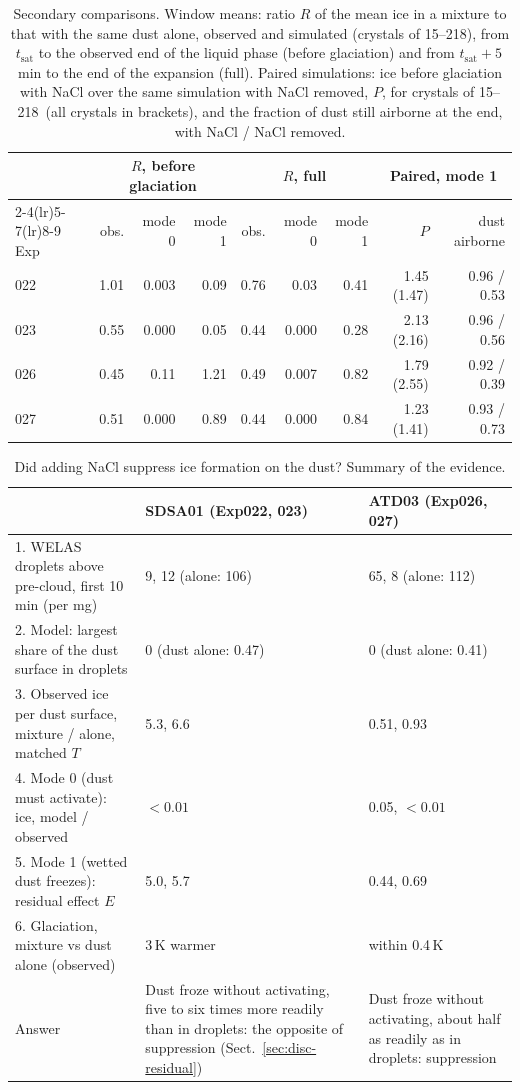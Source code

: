 \begin{table}[p]
\centering\footnotesize\setlength{\tabcolsep}{4pt}
\caption{Secondary comparisons. Window means: ratio $R$ of the mean ice in a mixture to that with the same dust alone, observed and simulated (crystals of 15--218\um), from $t_\mathrm{sat}$ to the observed end of the liquid phase (before glaciation) and from $t_\mathrm{sat}+5$\,min to the end of the expansion (full). Paired simulations: ice before glaciation with NaCl over the same simulation with NaCl removed, $P$, for crystals of 15--218\um\ (all crystals in brackets), and the fraction of dust still airborne at the end, with NaCl / NaCl removed.}
\label{tab:window}
\begin{tabular}{lrrrrrrrr}
\toprule
 & \multicolumn{3}{c}{$R$, before glaciation} & \multicolumn{3}{c}{$R$, full} & \multicolumn{2}{c}{Paired, mode 1} \\
\cmidrule(lr){2-4}\cmidrule(lr){5-7}\cmidrule(lr){8-9}
Exp & obs. & mode 0 & mode 1 & obs. & mode 0 & mode 1 & $P$ & dust airborne \\
\midrule
022 & 1.01 & 0.003 & 0.09 & 0.76 & 0.03 & 0.41 & 1.45 (1.47) & 0.96 / 0.53 \\
023 & 0.55 & 0.000 & 0.05 & 0.44 & 0.000 & 0.28 & 2.13 (2.16) & 0.96 / 0.56 \\
026 & 0.45 & 0.11 & 1.21 & 0.49 & 0.007 & 0.82 & 1.79 (2.55) & 0.92 / 0.39 \\
027 & 0.51 & 0.000 & 0.89 & 0.44 & 0.000 & 0.84 & 1.23 (1.41) & 0.93 / 0.73 \\
\bottomrule
\end{tabular}
\end{table}

\begin{table}[p]
\centering\footnotesize
\caption{Did adding NaCl suppress ice formation on the dust? Summary of the evidence.}
\label{tab:summary}
\begin{tabular}{p{6.8cm}p{3.7cm}p{3.7cm}}
\toprule
 & SDSA01 (Exp022, 023) & ATD03 (Exp026, 027) \\
\midrule
1. WELAS droplets above pre-cloud, first 10\,min (per mg) & 9, 12 (alone: 106) & 65, 8 (alone: 112) \\
2. Model: largest share of the dust surface in droplets & 0 (dust alone: 0.47) & 0 (dust alone: 0.41) \\
3. Observed ice per dust surface, mixture / alone, matched $T$ & 5.3, 6.6 & 0.51, 0.93 \\
4. Mode 0 (dust must activate): ice, model / observed & $<0.01$ & 0.05, $<0.01$ \\
5. Mode 1 (wetted dust freezes): residual effect $E$ & 5.0, 5.7 & 0.44, 0.69 \\
6. Glaciation, mixture vs dust alone (observed) & 3\,K warmer & within 0.4\,K \\
\midrule
Answer & Dust froze without activating, five to six times more readily than in droplets: the opposite of suppression (Sect.~\ref{sec:disc-residual}) & Dust froze without activating, about half as readily as in droplets: suppression \\
\bottomrule
\end{tabular}
\end{table}

